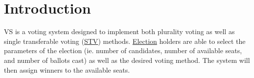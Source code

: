 \hypertarget{index_intro_sec}{}\section{Introduction}\label{index_intro_sec}
VS is a voting system designed to implement both plurality voting as well as single transferable voting (\hyperlink{class_s_t_v}{S\+TV}) methods. \hyperlink{class_election}{Election} holders are able to select the parameters of the election (ie. number of candidates, number of available seats, and number of ballots cast) as well as the desired voting method. The system will then assign winners to the available seats. 